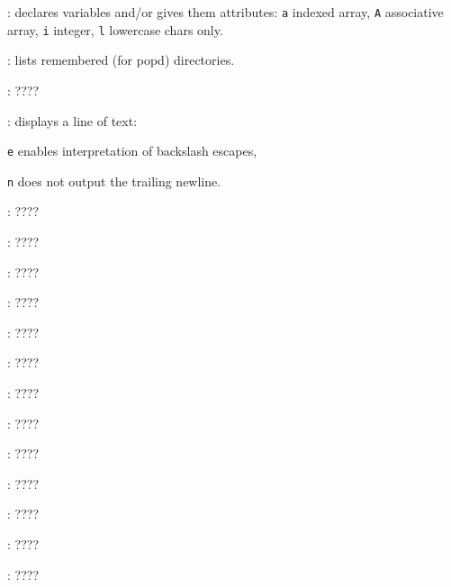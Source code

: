 \begin{compactenum}
\item [\symbolbash] : declares variables and/or gives them attributes: \texttt{a} indexed array, \texttt{A} associative array, \texttt{i} integer, \texttt{l} lowercase chars only.

\item [\symbolbash] : lists remembered (for popd) directories.

\item [\symbolbash] : \dotfill ????

\item [\symbolbash] : displays a line of text:
\item [\texttt{e}] enables interpretation of backslash escapes,
\item [\texttt{n}] does not output the trailing newline.

\item [\symbolbash] : \dotfill ????

\item [\symbolbash] : \dotfill ????

\item [\symbolbash] : \dotfill ????

\item [\symbolbash] : \dotfill ????

\item [\symbolbash] : \dotfill ????

\item [\symbolbash] : \dotfill ????

\item [\symbolbash] : \dotfill ????

\item [\symbolbash] : \dotfill ????

\item [\symbolbash] : \dotfill ????

\item [\symbolbash] : \dotfill ????

\item [\symbolbash] : \dotfill ????

\item [\symbolbash] : \dotfill ????

\item [\symbolbash] : \dotfill ????


\end{compactenum}
